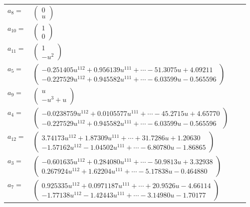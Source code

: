 \documentclass[1p]{elsarticle_modified}
\theoremstyle{definition}
\begin{document}
\begin{tabular}{m{7pt} m{180pt} m{7pt} m{180pt} }
\flushright $a_{8}=$&$\begin{pmatrix}0\\u\end{pmatrix}$ \\
\flushright $a_{10}=$&$\begin{pmatrix}1\\0\end{pmatrix}$ \\
\flushright $a_{11}=$&$\begin{pmatrix}1\\- u^2\end{pmatrix}$ \\
\flushright $a_{5}=$&$\begin{pmatrix}-0.251405 u^{112}+0.956139 u^{111}+\cdots-51.3075 u+4.09211\\-0.227529 u^{112}+0.945582 u^{111}+\cdots-6.03599 u-0.565596\end{pmatrix}$ \\
\flushright $a_{9}=$&$\begin{pmatrix}u\\- u^3+u\end{pmatrix}$ \\
\flushright $a_{4}=$&$\begin{pmatrix}-0.0238759 u^{112}+0.0105577 u^{111}+\cdots-45.2715 u+4.65770\\-0.227529 u^{112}+0.945582 u^{111}+\cdots-6.03599 u-0.565596\end{pmatrix}$ \\
\flushright $a_{12}=$&$\begin{pmatrix}3.74173 u^{112}+1.87309 u^{111}+\cdots+31.7286 u+1.20630\\-1.57162 u^{112}-1.04502 u^{111}+\cdots-6.80780 u-1.86865\end{pmatrix}$ \\
\flushright $a_{3}=$&$\begin{pmatrix}-0.601635 u^{112}+0.284080 u^{111}+\cdots-50.9813 u+3.32938\\0.267924 u^{112}+1.62204 u^{111}+\cdots-5.17838 u-0.464880\end{pmatrix}$ \\
\flushright $a_{7}=$&$\begin{pmatrix}0.925335 u^{112}+0.0971187 u^{111}+\cdots+20.9526 u-4.66114\\-1.77138 u^{112}-1.42443 u^{111}+\cdots-3.14980 u-1.70177\end{pmatrix}$ \\

\end{tabular}
\end{document}

